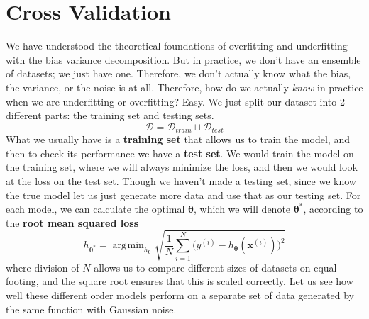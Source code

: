 \documentclass{article}
\DeclareMathOperator*{\argmin}{\arg\!\min}
\begin{document}
\section{Cross Validation} 

    We have understood the theoretical foundations of overfitting and underfitting with the bias variance decomposition. But in practice, we don't have an ensemble of datasets; we just have one. Therefore, we don't actually know what the bias, the variance, or the noise is at all. Therefore, how do we actually \textit{know} in practice when we are underfitting or overfitting? Easy. We just split our dataset into 2 different parts: the training set and testing sets. 
    \begin{equation}
      \mathcal{D} = \mathcal{D}_{train} \sqcup \mathcal{D}_{test}
    \end{equation}
    What we usually have is a \textbf{training set} that allows us to train the model, and then to check its performance we have a \textbf{test set}. We would train the model on the training set, where we will always minimize the loss, and then we would look at the loss on the test set. Though we haven't made a testing set, since we know the true model let us just generate more data and use that as our testing set. For each model, we can calculate the optimal $\boldsymbol{\theta}$, which we will denote $\boldsymbol{\theta}^\ast$, according to the \textbf{root mean squared loss}
    \begin{equation}
      h_{\boldsymbol{\theta}^\ast} = \argmin_{h_{\boldsymbol{\theta}}} \sqrt{ \frac{1}{N} \sum_{i=1}^N \big( y^{(i)} - h_{\boldsymbol{\theta}} (\mathbf{x}^{(i)}) \big)^2 }
    \end{equation}
    where division of $N$ allows us to compare different sizes of datasets on equal footing, and the square root ensures that this is scaled correctly. Let us see how well these different order models perform on a separate set of data generated by the same function with Gaussian noise. 
\end{document}
